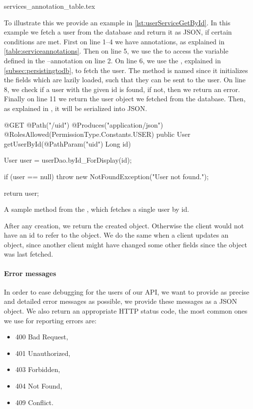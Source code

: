 {services_annotation_table.tex}

\bigskip
To illustrate this we provide an example in \cref{lst:userServiceGetById}.
In this example we fetch a user from the database and return it as JSON, if certain conditions are met.
First on line 1--4 we have annotations, as explained in \cref{table:serviceannotations}.
Then on line 5, we use the  to access the variable defined in the --annotation on line 2.
On line 6, we use the , explained in \cref{subsec:persistingtodb}, to fetch the user.
The method is named  since it initializes the fields which are lazily loaded, such that they can be sent to the user.
On line 8, we check if a user with the given id is found, if not, then we return an error.
Finally on line 11 we return the user object we fetched from the database.
Then, as explained in , it will be serialized into JSON.
\begin{listing}
    \begin{java2}
@GET
@Path("/{uid}")
@Produces("application/json")
@RolesAllowed({PermissionType.Constants.USER})
public User getUserById(@PathParam("uid") Long id) {
    User user = userDao.byId_ForDisplay(id);

    if (user == null)
        throw new NotFoundException("User not found.");

    return user;
}
    \end{java2}
    \caption{A sample method from the , which fetches a single user by id.}\label{lst:userServiceGetById}
\end{listing}

After any creation, we return the created object. 
Otherwise the client would not have an id to refer to the object.
We do the same when a client updates an object, 
since another client might have changed some other fields since the object was last fetched. 

\bigskip
\paragraph*{Error messages}
In order to ease debugging for the users of our API, we want to provide as precise and detailed error messages as possible,
we provide these messages as a JSON object.
We also return an appropriate HTTP status code, the most common ones we use for reporting errors are:
\begin{multicols}{3}
\begin{itemize}
    \item 400 Bad Request,
    \item 401 Unauthorized,
    \item 403 Forbidden,
    \item 404 Not Found,
    \item 409 Conflict.
\end{itemize}
\end{multicols}

